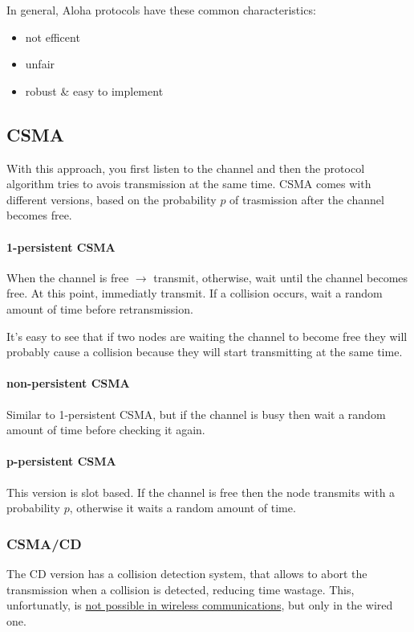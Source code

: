 In general, Aloha protocols have these common characteristics:
\begin{itemize}
\item not efficent
\item unfair
\item robust \& easy to implement
\end{itemize}

\subsection{CSMA}

With this approach, you first listen to the channel and then the protocol
algorithm tries to avois transmission at the same time. CSMA comes with
different versions, based on the probability $p$ of trasmission after the
channel becomes free.

\paragraph*{1-persistent CSMA} When the channel is free $\to$ transmit,
otherwise, wait until the channel becomes free. At this point, immediatly
transmit. If a collision occurs, wait a random amount of time before
retransmission.

It's easy to see that if two nodes are waiting the channel to become free they
will probably cause a collision because they will start transmitting at the
same time.

\paragraph*{non-persistent CSMA} Similar to 1-persistent CSMA, but if the
channel is busy then wait a random amount of time before checking it again.

\paragraph*{p-persistent CSMA} This version is slot based. If the channel is
free then the node transmits with a probability $p$, otherwise it waits a random
amount of time.

\subsubsection{CSMA/CD}

The CD version has a collision detection system, that allows to abort the
transmission when a collision is detected, reducing time wastage. This,
unfortunatly, is \underline{not possible in wireless communications}, but only
in the wired one.

